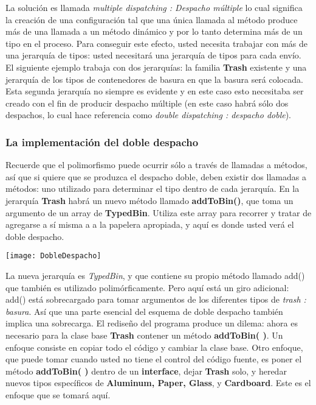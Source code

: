 La solución es llamada  \textit{multiple dispatching : Despacho múltiple} lo cual significa la creación de una configuración tal que una única llamada al método produce más de una llamada a un método dinámico y por lo tanto determina más de un tipo en el proceso. Para conseguir este efecto, usted necesita trabajar con más de una jerarquía de tipos: usted necesitará una jerarquía de tipos para cada envío. El siguiente ejemplo trabaja con dos jerarquías: la familia \textbf{Trash} existente y una jerarquía de los tipos de contenedores de basura en que la basura será colocada. Esta segunda jerarquía no siempre es evidente y en este caso esto necesitaba ser creado con el fin de producir despacho múltiple (en este caso habrá sólo dos despachos, lo cual hace referencia como \textit{double dispatching : despacho doble}).
\newpage



\subsubsection*{La implementación del doble despacho}
\label{subsubsec:liddd}


Recuerde que el polimorfismo puede ocurrir sólo a través de llamadas a métodos, así que si quiere que se produzca el despacho doble, deben existir dos llamadas a métodos: uno utilizado para determinar el tipo dentro de cada jerarquía. En la jerarquía \textbf{Trash} habrá un nuevo método llamado \textbf{addToBin()}, que toma un argumento de un array de \textbf{TypedBin}. Utiliza este array para recorrer y tratar de agregarse a sí misma a a la papelera apropiada, y aquí es donde usted verá el doble despacho.          \newline

\texttt{[image: DobleDespacho]}

\vspace{0.5 cm}

La nueva jerarquía es \textit{TypedBin}, y que contiene su propio método llamado add() que también es utilizado polimórficamente. Pero aquí está un giro adicional: add() está sobrecargado  para tomar argumentos de los diferentes tipos de \textit{trash : basura}. Así que una parte esencial del esquema de doble despacho también implica una sobrecarga. El rediseño del programa produce un dilema: ahora es necesario para la clase base \textbf{Trash} contener un método \textbf{addToBin( )}. Un enfoque consiste en copiar todo el código y cambiar la clase base. Otro enfoque, que puede tomar cuando usted no tiene el control del código fuente, es poner el método \textbf{addToBin( )} dentro de un \textbf{interface}, dejar \textbf{Trash} solo, y heredar nuevos tipos específicos de \textbf{Aluminum, Paper, Glass}, y \textbf{Cardboard}. Este es el enfoque que se tomará aquí.    \newline

